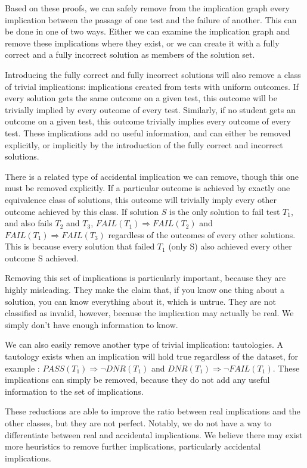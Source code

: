\documentclass[11pt,twoside]{article}
\newcommand\dnr{\ensuremath{\mathit{DNR}}}
\newcommand\fail{\mathit{FAIL}}
\newcommand\pass{\mathit{PASS}}
\theoremstyle{definition}
\begin{document}
Based on these proofs, we can safely remove from the implication graph every implication between the passage of one test and the failure of another. This can be done in one of two ways. Either we can examine the implication graph and remove these implications where they exist, or we can create it with a fully correct and a fully incorrect solution as members of the solution set.

Introducing the fully correct and fully incorrect solutions will also remove a class of trivial implications: implications created from tests with uniform outcomes. If every solution gets the same outcome on a given test, this outcome will be trivially implied by every outcome of every test. Similarly, if no student gets an outcome on a given test, this outcome trivially implies every outcome of every test. These implications add no useful information, and can either be removed explicitly, or implicitly by the introduction of the fully correct and incorrect solutions.

There is a related type of accidental implication we can remove, though this one must be removed explicitly. If a particular outcome is achieved by exactly one equivalence class of solutions, this outcome will trivially imply every other outcome achieved by this class. If solution $S$ is the only solution to fail test $T_1$, and also fails $T_2$ and $T_3$, $\fail(T_1) \Rightarrow \fail(T_2)$ and $\fail(T_1) \Rightarrow \fail(T_3)$ regardless of the outcomes of every other solutions. This is because every solution that failed $T_1$ (only S) also achieved every other outcome S achieved. 

Removing this set of implications is particularly important, because they are highly misleading. They make the claim that, if you know one thing about a solution, you can know everything about it, which is untrue. They are not classified as invalid, however, because the implication may actually be real. We simply don't have enough information to know.

We can also easily remove another type of trivial implication: tautologies. A tautology exists when an implication will hold true regardless of the dataset, for example : $\pass(T_1) \Rightarrow \neg\dnr(T_1)$ and $\dnr(T_1) \Rightarrow \neg\fail(T_1)$. These implications can simply be removed, because they do not add any useful information to the set of implications.

These reductions are able to improve the ratio between real implications and the other classes, but they are not perfect. Notably, we do not have a way to differentiate between real and accidental implications. We believe there may exist more heuristics to remove further implications, particularly accidental implications.
\end{document}
